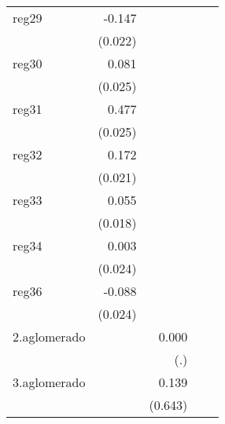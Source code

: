 {\begin{longtable}{l*{4}{D{.}{.}{-1}}}
\addlinespace
reg29       &      -0.147\sym{***}&                     &                     &                     \\
            &     (0.022)         &                     &                     &                     \\
\addlinespace
reg30       &       0.081\sym{**} &                     &                     &                     \\
            &     (0.025)         &                     &                     &                     \\
\addlinespace
reg31       &       0.477\sym{***}&                     &                     &                     \\
            &     (0.025)         &                     &                     &                     \\
\addlinespace
reg32       &       0.172\sym{***}&                     &                     &                     \\
            &     (0.021)         &                     &                     &                     \\
\addlinespace
reg33       &       0.055\sym{**} &                     &                     &                     \\
            &     (0.018)         &                     &                     &                     \\
\addlinespace
reg34       &       0.003         &                     &                     &                     \\
            &     (0.024)         &                     &                     &                     \\
\addlinespace
reg36       &      -0.088\sym{***}&                     &                     &                     \\
            &     (0.024)         &                     &                     &                     \\
\addlinespace
2.aglomerado&                     &       0.000         &                     &                     \\
            &                     &         (.)         &                     &                     \\
\addlinespace
3.aglomerado&                     &       0.139         &                     &                     \\
            &                     &     (0.643)         &                     &                     \\

\end{longtable}}
